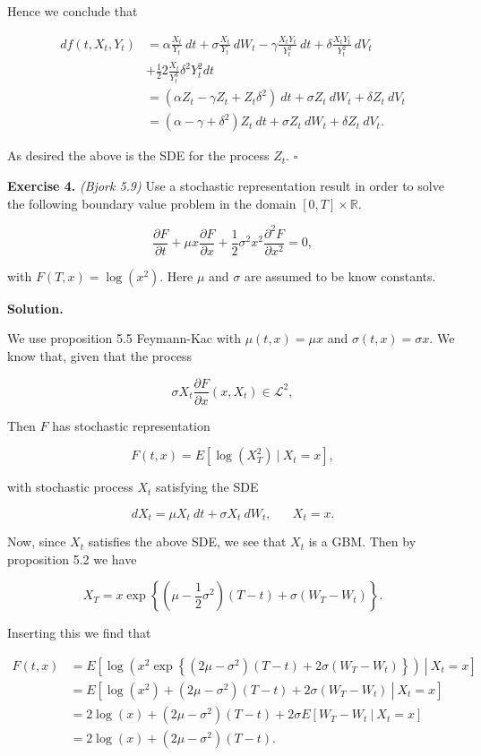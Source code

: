 \documentclass[
]{book}
\begin{document}
Hence we conclude that

\begin{align*}
df(t,X_t,Y_t)&=\alpha\frac{X_t}{Y_t}\ dt + \sigma \frac{X_t}{Y_t}\ dW_t-\gamma \frac{X_tY_t}{Y_t^2}\ dt+\delta \frac{X_tY_t}{Y_t^2}\ dV_t\\
&+\frac{1}{2}2\frac{X_t}{Y_t^3}\delta^2Y_t^2 dt\\
&=\left(\alpha Z_t-\gamma Z_t+Z_t\delta^2\right)\ dt+ \sigma Z_t\ dW_t+\delta Z_t\ dV_t\\
&=\left(\alpha -\gamma +\delta^2\right)Z_t\ dt+ \sigma Z_t\ dW_t+\delta Z_t\ dV_t.
\end{align*}

As desired the above is the SDE for the process \(Z_t\). \(\square\)

\textbf{Exercise 4.} \emph{(Bjork 5.9)} Use a stochastic representation result in order to solve the following boundary value problem in the domain \([0,T]\times\mathbb{R}\).

\[
\frac{\partial F}{\partial t}+\mu x\frac{\partial F}{\partial x}+\frac{1}{2}\sigma^2x^2\frac{\partial^2F}{\partial x^2}=0,
\]

with \(F(T,x)=\log(x^2)\). Here \(\mu\) and \(\sigma\) are assumed to be know constants.

\textbf{Solution.}

We use proposition 5.5 Feymann-Kac with \(\mu(t,x)=\mu x\) and \(\sigma(t,x)=\sigma x\). We know that, given that the process

\[
\sigma X_t \frac{\partial F}{\partial x}(x,X_t)\in \mathcal{L}^2,
\]

Then \(F\) has stochastic representation

\[
F(t,x)=E[\log(X_T^2)\ \vert\ X_t=x],
\]

with stochastic process \(X_t\) satisfying the SDE

\[
dX_t=\mu X_t\ dt+\sigma X_t\ dW_t,\hspace{20pt} X_t=x.
\]

Now, since \(X_t\) satisfies the above SDE, we see that \(X_t\) is a GBM. Then by proposition 5.2 we have

\[
X_T=x\exp\left\{\left(\mu - \frac{1}{2}\sigma^2\right)(T-t)+\sigma(W_T-W_t)\right\}.
\]

Inserting this we find that

\begin{align*}
F(t,x)&=E\left.\left[\log(x^2\exp\left\{\left(2\mu - \sigma^2\right)(T-t)+2\sigma(W_T-W_t)\right\})\ \right\vert\ X_t=x\right]\\
&=E\left.\left[\log(x^2)+\left(2\mu - \sigma^2\right)(T-t)+2\sigma(W_T-W_t)\ \right\vert\ X_t=x\right]\\
&=2\log(x)+\left(2\mu - \sigma^2\right)(T-t)+2\sigma E\left.\left[W_T-W_t\ \right\vert\ X_t=x\right]\\
&=2\log(x)+\left(2\mu - \sigma^2\right)(T-t).
\end{align*}
\end{document}

